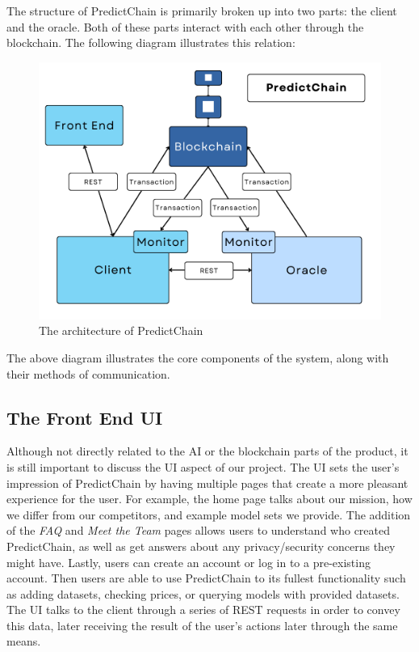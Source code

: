 \documentclass{ledger}
\begin{document}
The structure of PredictChain is primarily broken up into two parts: the client and the oracle.  Both of these parts
interact with each other through the blockchain.  The following diagram illustrates this relation:

\begin{figure}[H]
    \begin{center}
        \begin{minipage}{0.6\textwidth}
        \centering
        \includegraphics[width=\linewidth]{images/detailedDiagram}
        \caption{The architecture of PredictChain}\label{Fig:detailedDiagram}
    \end{minipage}\hfill
    \end{center}
\end{figure}

The above diagram illustrates the core components of the system, along with their methods of communication.

\subsection{The Front End UI}
Although not directly related to the AI or the blockchain parts of the product, it is still important to discuss the UI
aspect of our project. The UI sets the user's impression of PredictChain by having multiple pages that create a more
pleasant experience for the user. For example, the home page talks about our mission, how we differ from our competitors,
and example model sets we provide. The addition of the \textit{FAQ} and \textit{Meet the Team} pages allows users to
understand who created PredictChain, as well as get answers about any privacy/security concerns they might have. Lastly,
users can create an account or log in to a pre-existing account. Then users are able to use PredictChain to its fullest
functionality such as adding datasets, checking prices, or querying models with provided datasets. The UI talks to the
client through a series of REST requests in order to convey this data, later receiving the result of the user's actions
later through the same means.
\end{document}
